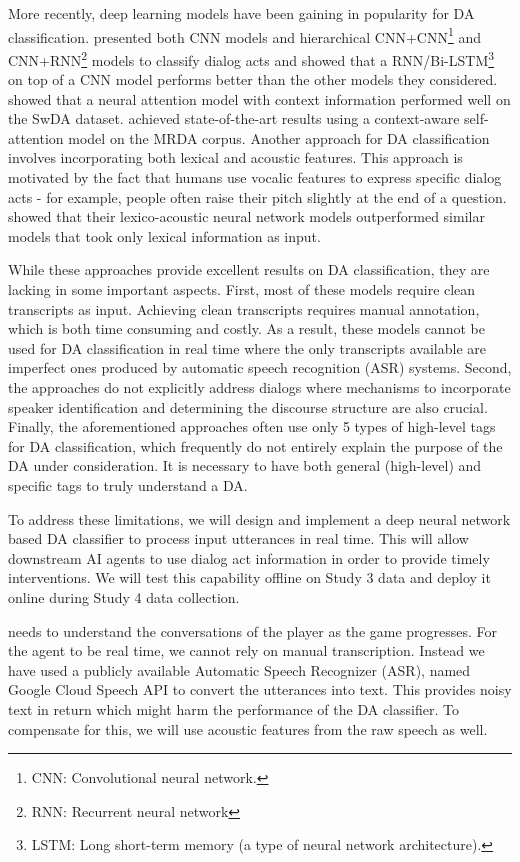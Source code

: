 More recently, deep learning models have been gaining in popularity for DA
classification. \citet{Liu.ea:2017} presented both CNN models and hierarchical
CNN+CNN\footnote{CNN: Convolutional neural network.} and CNN+RNN\footnote{RNN:
Recurrent neural network} models to classify dialog acts and showed that a
RNN/Bi-LSTM\footnote{LSTM: Long short-term memory (a type of neural network
architecture).} on top of a CNN model performs better than the other models
they considered.  \citet{Shen.ea:2016} showed that a neural attention model
with context information performed well on the SwDA dataset.
\citet{Raheja.ea:2019} achieved state-of-the-art results using a context-aware
self-attention model on the MRDA corpus. Another approach for DA classification
involves incorporating both lexical and acoustic features. This approach is
motivated by the fact that humans use vocalic features to express specific
dialog acts - for example, people often raise their pitch slightly at the end
of a question. \citet{Ortega.ea:2018} showed that their lexico-acoustic neural
network models outperformed similar models that took only lexical information
as input.

While these approaches provide excellent results on DA classification, they are
lacking in some important aspects.
First, most of these models require clean
transcripts as input. Achieving clean transcripts requires manual annotation,
which is both time consuming and costly. As a result, these models cannot be
used for DA classification in real time where the only transcripts available
are imperfect ones produced by automatic speech recognition (ASR) systems.
Second, the approaches do not explicitly address dialogs where mechanisms to
incorporate speaker identification and determining the discourse structure are
also crucial.
Finally, the aforementioned approaches often use only 5 types of high-level
tags for DA classification, which frequently do not entirely explain the
purpose of the DA under consideration. It is necessary to have both general
(high-level) and specific tags to truly understand a DA.

To address these limitations, we will design and implement a deep neural
network based DA classifier to process input utterances in real time. This will
allow downstream AI agents to use dialog act information in order to provide
timely interventions. We will test this capability offline on Study 3 data and
deploy it online during Study 4 data collection.

needs to understand the conversations of the player as the game progresses. For
the agent to be real time, we cannot rely on manual transcription. Instead we
have used a publicly available Automatic Speech Recognizer (ASR), named Google
Cloud Speech API to convert the utterances into text. This provides noisy text
in return which might harm the performance of the DA classifier. To compensate
for this, we will use acoustic features from the raw speech as well.

